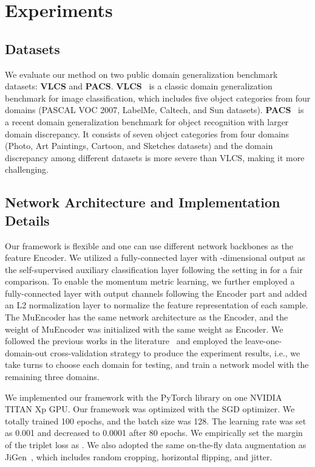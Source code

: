 \section{Experiments}

\subsection{Datasets}
We evaluate our method on two public domain generalization benchmark datasets: \textbf{VLCS} and \textbf{PACS}. \textbf{VLCS}~\cite{fang2013unbiased} is a classic domain generalization benchmark for image classification, which includes five object categories from four domains (PASCAL VOC 2007, LabelMe, Caltech, and Sun datasets).
\textbf{PACS}~\cite{li2017deeper} is a recent domain generalization benchmark for object recognition with larger domain discrepancy. It consists of seven object categories from four domains (Photo, Art Paintings, Cartoon, and Sketches datasets) and the domain discrepancy among different datasets is more severe than VLCS, making it more challenging. 



\subsection{Network Architecture and Implementation Details}
Our framework is flexible and one can use different network backbones as the feature Encoder. 
We utilized a fully-connected layer with -dimensional output as the self-supervised auxiliary classification layer following the setting in \cite{carlucci2019domain} for a fair comparison. 
To enable the momentum metric learning, we further employed a fully-connected layer with  output channels following the Encoder part and added an L2 normalization layer to normalize the feature representation  of each sample.
The MuEncoder has the same network architecture as the Encoder, and the weight of MuEncoder was initialized with the same weight as Encoder.
We followed the previous works in the literature~\cite{balaji2018metareg,carlucci2019domain,li2018learning,dou2019domain} and employed the leave-one-domain-out cross-validation strategy to produce the experiment results, i.e., we take turns to choose each domain for testing, and train a network model with the remaining three domains.


We implemented our framework with the PyTorch library on one NVIDIA TITAN Xp GPU.
Our framework was optimized with the SGD optimizer. We totally trained 100 epochs, and the batch size was 128. 
The learning rate was set as 0.001 and decreased to 0.0001 after 80 epochs.
We empirically set the margin of the triplet loss as .
We also adopted the same on-the-fly data augmentation as JiGen~\cite{carlucci2019domain}, which includes random cropping, horizontal flipping, and jitter.



